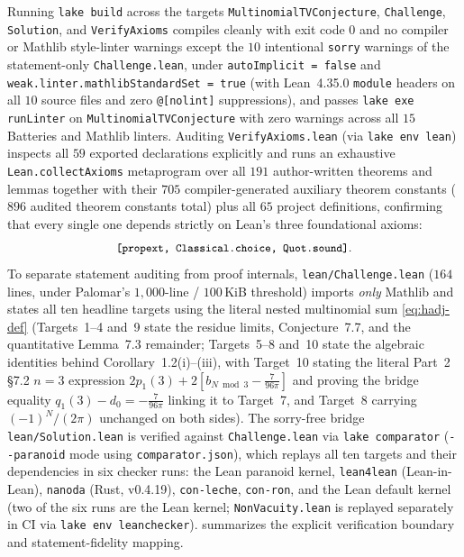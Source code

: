 \documentclass[11pt,a4paper]{article}
\numberwithin{equation}{section}
\theoremstyle{plain}
\theoremstyle{definition}
\theoremstyle{remark}
\newcommand{\code}[1]{\texttt{\small #1}}
\begin{document}
Running \code{lake build} across the targets \code{MultinomialTVConjecture}, \code{Challenge}, \code{Solution}, and \code{VerifyAxioms} compiles cleanly with exit code $0$ and no compiler or Mathlib style-linter warnings except the $10$ intentional \code{sorry} warnings of the statement-only \code{Challenge.lean}, under \code{autoImplicit = false} and \code{weak.linter.mathlibStandardSet = true} (with Lean~4.35.0 \code{module} headers on all $10$ source files and zero \code{@[nolint]} suppressions), and passes \code{lake exe runLinter} on \code{MultinomialTVConjecture} with zero warnings across all $15$ Batteries and Mathlib linters. Auditing \code{VerifyAxioms.lean} (via \code{lake env lean}) inspects all $59$ exported declarations explicitly and runs an exhaustive \code{Lean.collectAxioms} metaprogram over all $191$ author-written theorems and lemmas together with their $705$ compiler-generated auxiliary theorem constants ($896$ audited theorem constants total) plus all $65$ project definitions, confirming that every single one depends strictly on Lean's three foundational axioms:
\[
  \code{[propext, Classical.choice, Quot.sound]}.
\]
To separate statement auditing from proof internals, \code{lean/Challenge.lean} ($164$ lines, under Palomar's $1{,}000$-line / $100$\,KiB threshold) imports \emph{only} Mathlib and states all ten headline targets using the literal nested multinomial sum \eqref{eq:hadj-def} (Targets~1--4 and~9 state the residue limits, Conjecture~7.7, and the quantitative Lemma~7.3 remainder; Targets~5--8 and~10 state the algebraic identities behind Corollary~1.2(i)--(iii), with Target~10 stating the literal Part~2 \S7.2 $n=3$ expression $2p_1(3)+2[b_{N\bmod 3}-\frac{7}{96\pi}]$ and proving the bridge equality $q_1(3)-d_0=-\frac{7}{96\pi}$ linking it to Target~7, and Target~8 carrying $(-1)^N/(2\pi)$ unchanged on both sides). The sorry-free bridge \code{lean/Solution.lean} is verified against \code{Challenge.lean} via \code{lake comparator} (\code{{-}{-}paranoid} mode using \code{comparator.json}), which replays all ten targets and their dependencies in six checker runs: the Lean paranoid kernel, \code{lean4lean} (Lean-in-Lean), \code{nanoda} (Rust, v0.4.19), \code{con-leche}, \code{con-ron}, and the Lean default kernel (two of the six runs are the Lean kernel; \code{NonVacuity.lean} is replayed separately in CI via \code{lake env leanchecker}).  summarizes the explicit verification boundary and statement-fidelity mapping.
\end{document}
